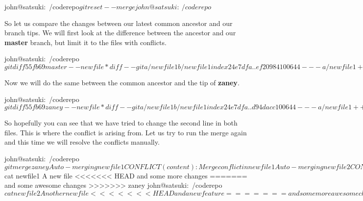 \begin{code}
john@satsuki:~/coderepo$ git reset --merge
john@satsuki:~/coderepo$
\end{code}

So let us compare the changes between our latest common ancestor and our branch tips.
We will first look at the difference between the ancestor and our \textbf{master} branch, but limit it to the files with conflicts.

\begin{code}
john@satsuki:~/coderepo$ git diff 55fb69 master -- newfile*
diff --git a/newfile1 b/newfile1
index 24e7dfa..ef20984 100644
--- a/newfile1
+++ b/newfile1
@@ -1 +1,2 @@
 A new file
+and some more changes
diff --git a/newfile2 b/newfile2
index cba16cc..dac4357 100644
--- a/newfile2
+++ b/newfile2
@@ -1 +1,2 @@
 Another new file
+and a new feature
john@satsuki:~/coderepo$
\end{code}

Now we will do the same between the common ancestor and the tip of \textbf{zaney}.

\begin{code}
john@satsuki:~/coderepo$ git diff 55fb69 zaney -- newfile*
diff --git a/newfile1 b/newfile1
index 24e7dfa..d94dacc 100644
--- a/newfile1
+++ b/newfile1
@@ -1 +1,2 @@
 A new file
+and some awesome changes
diff --git a/newfile2 b/newfile2
index cba16cc..45659d7 100644
--- a/newfile2
+++ b/newfile2
@@ -1 +1,2 @@
 Another new file
+and some more awesome changes
john@satsuki:~/coderepo$
\end{code}

So hopefully you can see that we have tried to change the second line in both files.
This is where the conflict is arising from.
Let us try to run the merge again and this time we will resolve the conflicts manually.

\begin{code}
john@satsuki:~/coderepo$ git merge zaney
Auto-merging newfile1
CONFLICT (content): Merge conflict in newfile1
Auto-merging newfile2
CONFLICT (content): Merge conflict in newfile2
Automatic merge failed; fix conflicts and then commit the result.
john@satsuki:~/coderepo$ cat newfile1
A new file
<<<<<<< HEAD
and some more changes
=======
and some awesome changes
>>>>>>> zaney
john@satsuki:~/coderepo$ cat newfile2
Another new file
<<<<<<< HEAD
and a new feature
=======
and some more awesome changes
>>>>>>> zaney
john@satsuki:~/coderepo$
\end{code}

